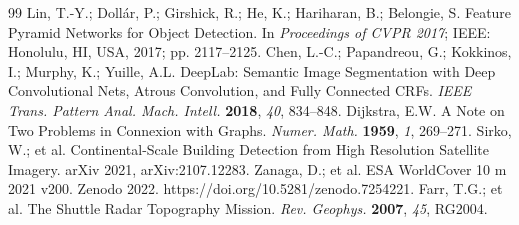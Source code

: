 \begin{thebibliography}{99}
 Lin, T.-Y.; Doll\'ar, P.; Girshick, R.; He, K.; Hariharan, B.; Belongie, S. Feature Pyramid Networks for Object Detection. In \textit{Proceedings of CVPR 2017}; IEEE: Honolulu, HI, USA, 2017; pp. 2117--2125.
 Chen, L.-C.; Papandreou, G.; Kokkinos, I.; Murphy, K.; Yuille, A.L. DeepLab: Semantic Image Segmentation with Deep Convolutional Nets, Atrous Convolution, and Fully Connected CRFs. \textit{IEEE Trans. Pattern Anal. Mach. Intell.} \textbf{2018}, \textit{40}, 834--848.
 Dijkstra, E.W. A Note on Two Problems in Connexion with Graphs. \textit{Numer. Math.} \textbf{1959}, \textit{1}, 269--271.
 Sirko, W.; et al. Continental-Scale Building Detection from High Resolution Satellite Imagery. arXiv 2021, arXiv:2107.12283.
 Zanaga, D.; et al. ESA WorldCover 10 m 2021 v200. Zenodo 2022. https://doi.org/10.5281/zenodo.7254221.
 Farr, T.G.; et al. The Shuttle Radar Topography Mission. \textit{Rev. Geophys.} \textbf{2007}, \textit{45}, RG2004.
\end{thebibliography}
